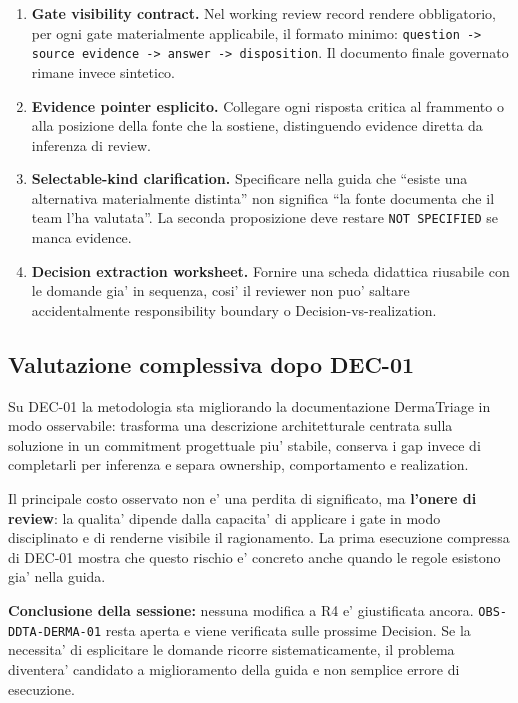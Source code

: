 \documentclass[11pt,a4paper]{article}
\begin{document}
\begin{ddtaworking}[title={Miglioramenti da verificare, non ancora promossi}]
\begin{enumerate}
  \item \textbf{Gate visibility contract.} Nel working review record rendere obbligatorio, per ogni gate materialmente applicabile, il formato minimo: \texttt{question -> source evidence -> answer -> disposition}. Il documento finale governato rimane invece sintetico.
  \item \textbf{Evidence pointer esplicito.} Collegare ogni risposta critica al frammento o alla posizione della fonte che la sostiene, distinguendo evidence diretta da inferenza di review.
  \item \textbf{Selectable-kind clarification.} Specificare nella guida che ``esiste una alternativa materialmente distinta'' non significa ``la fonte documenta che il team l'ha valutata''. La seconda proposizione deve restare \texttt{NOT SPECIFIED} se manca evidence.
  \item \textbf{Decision extraction worksheet.} Fornire una scheda didattica riusabile con le domande gia' in sequenza, cosi' il reviewer non puo' saltare accidentalmente responsibility boundary o Decision-vs-realization.
\end{enumerate}
\end{ddtaworking}

\subsection{Valutazione complessiva dopo DEC-01}

\begin{ddtacore}[title={Valutazione provvisoria}]
Su DEC-01 la metodologia sta migliorando la documentazione DermaTriage in modo osservabile: trasforma una descrizione architetturale centrata sulla soluzione in un commitment progettuale piu' stabile, conserva i gap invece di completarli per inferenza e separa ownership, comportamento e realization.

Il principale costo osservato non e' una perdita di significato, ma \textbf{l'onere di review}: la qualita' dipende dalla capacita' di applicare i gate in modo disciplinato e di renderne visibile il ragionamento. La prima esecuzione compressa di DEC-01 mostra che questo rischio e' concreto anche quando le regole esistono gia' nella guida.

\textbf{Conclusione della sessione:} nessuna modifica a R4 e' giustificata ancora. \texttt{OBS-DDTA-DERMA-01} resta aperta e viene verificata sulle prossime Decision. Se la necessita' di esplicitare le domande ricorre sistematicamente, il problema diventera' candidato a miglioramento della guida e non semplice errore di esecuzione.
\end{ddtacore}
\end{document}
